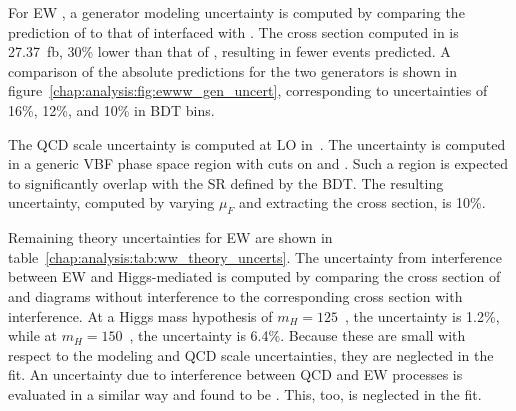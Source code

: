 For EW \ww, a generator modeling uncertainty is computed by comparing the
prediction of \SHERPA to that of \MADGRAPH interfaced
with \PYTHIA. The cross section computed in \MADGRAPH is 27.37~fb,
30\% lower than that of \SHERPA, resulting in fewer events
predicted. A comparison of the absolute predictions for the two
generators is shown in
figure~\ref{chap:analysis:fig:ewww_gen_uncert}, corresponding to
uncertainties of 16\%, 12\%, and 10\% in BDT bins. 

The QCD scale uncertainty is computed at LO
in~\cite{bib:Jager:2006zc}. The uncertainty is computed in a generic
VBF phase space region with cuts on \dyjj and \mjj. Such a region is
expected to significantly overlap with the SR defined by the BDT. The
resulting uncertainty, computed by varying $\mu_F$ and extracting the
cross section, is 10\%. 

Remaining theory uncertainties for EW \ww are shown in
table~\ref{chap:analysis:tab:ww_theory_uncerts}. The uncertainty from interference
between EW \ww and Higgs-mediated \ww is computed by comparing the
cross section of \ww and \hww diagrams without interference to the
corresponding cross section with interference. At a Higgs mass
hypothesis of $m_H = 125$~\gev, the uncertainty is 1.2\%, while at
$m_H = 150$~\gev, the uncertainty is 6.4\%. Because these are small
with respect to the modeling and QCD scale uncertainties, they are
neglected in the fit. An uncertainty due to interference between QCD
and EW \ww processes is evaluated in a similar way and found to
be . This, too, is neglected in the fit. 





